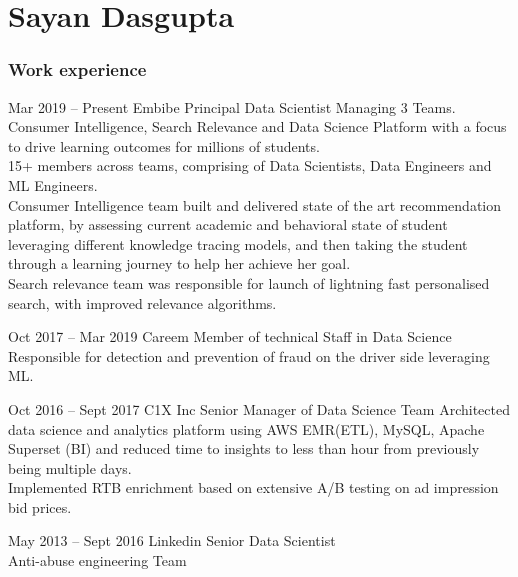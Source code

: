 \documentclass{tccv}
\begin{document}
\part{Sayan Dasgupta}

\section{Work experience}

\begin{eventlist}

\item{Mar 2019 -- Present}
  {Embibe}
  {Principal Data Scientist}
  Managing 3 Teams. Consumer Intelligence, Search Relevance and Data Science Platform with a focus to drive learning outcomes for millions of students. \\
  15+ members across teams, comprising of Data Scientists, Data Engineers and ML Engineers. \\
  Consumer Intelligence team built and delivered state of the art recommendation platform, by assessing current academic and behavioral state of student leveraging different knowledge tracing models, and then taking the student through a learning journey to help her achieve her goal. \\
  Search relevance team was responsible for launch of lightning fast personalised search, with improved relevance algorithms. \\
  
  
  
\item{Oct 2017 -- Mar 2019}
  {Careem}
  {Member of technical Staff in Data Science}
  Responsible for detection and prevention of fraud on the driver side leveraging ML.

\item{Oct 2016 -- Sept 2017}
     {C1X Inc}
     {Senior Manager of Data Science}
Team Architected data science and analytics platform using AWS EMR(ETL), MySQL, Apache Superset (BI) and reduced time to insights to less than hour from previously being multiple days. \\
Implemented RTB enrichment based on extensive A/B testing on ad impression bid prices. \\

\item{May 2013 -- Sept 2016}
     {Linkedin}
     {Senior Data Scientist \\ Anti-abuse engineering Team}


\end{eventlist}
\end{document}
